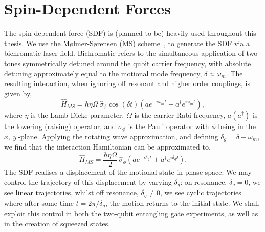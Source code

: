 \documentclass[12pt]{report}
\begin{document}
\section{Spin-Dependent Forces}
\label{sec:Spin-Dependent Forces}
    The spin-dependent force (SDF) is (planned to be) heavily used throughout
    this thesis. We use the Mølmer-Sørensen (MS) scheme~\cite{}, to generate the
    SDF via a bichromatic laser field. Bichromatic refers to the simultaneous
    application of two tones symmetrically detuned around the qubit carrier
    frequency, with absolute detuning approximately equal to the motional mode
    frequency, $\delta \approx \omega_{m}$. The resulting interaction, when
    ignoring off resonant and higher order couplings, is given by,
    \begin{equation}
        \hat{H}_{MS} = \hbar \eta\Omega~\hat{\sigma}_\phi\cos(\delta t) \left( a e^{-i\omega_{m} t} + a^\dagger e^{i\omega_{m} t} \right),
    \end{equation}
    where $\eta$ is the Lamb-Dicke parameter, $\Omega$ is the carrier Rabi
    frequency, $a(a^\dagger)$ is the lowering (raising) operator, and
    $\sigma_\phi$ is the Pauli operator with $\phi$ being in the $x,~y~$-plane.
    Applying the rotating wave approximation, and defining $\delta_g = \delta -
    \omega_{m}$, we find that the interaction Hamiltonian can be approximated
    to,
    \begin{equation}
        \hat{H}_{MS} = \frac{\hbar \eta\Omega}{2}~\hat{\sigma}_\phi \left( a e^{-i\delta_g t} + a^\dagger e^{i\delta_g t} \right).
    \end{equation}
    The SDF realises a displacement of the motional state in phase space. We may
    control the trajectory of this displacement by varying $\delta_g$: on
    resonance, $\delta_g = 0$, we see linear trajectories, whilst off resonance,
    $\delta_g \neq 0$, we see cyclic trajectories where after some time $t =
    2\pi/\delta_g$, the motion returns to the initial state. We shall exploit
    this control in both the two-qubit entangling gate experiments, as well as
    in the creation of squeezed states.\\
\end{document}
